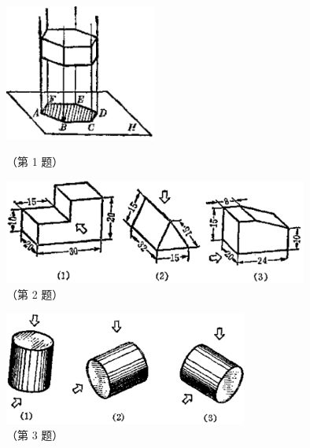 \xiti
\begin{xiaotis}


\begin{figure}[htbp]
    \centering
    \begin{minipage}[b]{5.1cm}
        \centering
        \includegraphics[width=5cm]{../pic/czjh2-ch8-xiti29-01.png}
        \caption*{（第 1 题）}
    \end{minipage}
    \qquad
    \begin{minipage}[b]{10cm}
        \centering
        \includegraphics[width=10cm]{../pic/czjh2-ch8-xiti29-02.png}
        \caption*{（第 2 题）}
    \end{minipage}
\end{figure}




\begin{figure}[htbp]
    \centering
    \includegraphics[width=8cm]{../pic/czjh2-ch8-xiti29-03.png}
    \caption*{（第 3 题）}
\end{figure}



\end{xiaotis}
